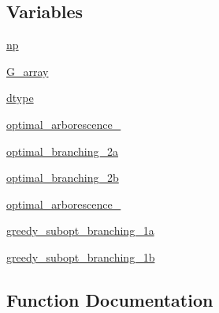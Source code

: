 \subsection*{Variables}
\begin{DoxyCompactItemize}
\item 
\hyperlink{namespacenetworkx_1_1algorithms_1_1tree_1_1tests_1_1test__branchings_ae2507982e07789df9fcd05d5cbb41c9a}{np}
\item 
\hyperlink{namespacenetworkx_1_1algorithms_1_1tree_1_1tests_1_1test__branchings_a1066de0f0cde2bc3fb40609c1d8a3f7e}{G\+\_\+array}
\item 
\hyperlink{namespacenetworkx_1_1algorithms_1_1tree_1_1tests_1_1test__branchings_ac92ce4cb48dc16593d99a1138f9f496b}{dtype}
\item 
\hyperlink{namespacenetworkx_1_1algorithms_1_1tree_1_1tests_1_1test__branchings_a4bffbaac2617620e58fd1049a7f058d2}{optimal\+\_\+arborescence\+\_}
\item 
\hyperlink{namespacenetworkx_1_1algorithms_1_1tree_1_1tests_1_1test__branchings_a8c3bf41acd4c2bae02510c1424eb2863}{optimal\+\_\+branching\+\_\+2a}
\item 
\hyperlink{namespacenetworkx_1_1algorithms_1_1tree_1_1tests_1_1test__branchings_a8135729f7457587c48709fc3bc9a8fa3}{optimal\+\_\+branching\+\_\+2b}
\item 
\hyperlink{namespacenetworkx_1_1algorithms_1_1tree_1_1tests_1_1test__branchings_ad4c7c306075062769b8edb2b84e9f926}{optimal\+\_\+arborescence\+\_}
\item 
\hyperlink{namespacenetworkx_1_1algorithms_1_1tree_1_1tests_1_1test__branchings_a4b7e7017ae58e94acd707ca1742f0c20}{greedy\+\_\+subopt\+\_\+branching\+\_\+1a}
\item 
\hyperlink{namespacenetworkx_1_1algorithms_1_1tree_1_1tests_1_1test__branchings_a03515da1a09dcd4b94a50c115fe1d9cb}{greedy\+\_\+subopt\+\_\+branching\+\_\+1b}
\end{DoxyCompactItemize}


\subsection{Function Documentation}
\mbox{\label{namespacenetworkx_1_1algorithms_1_1tree_1_1tests_1_1test__branchings_a5a118ea8fbc3d56205acebbbacbbb479}} 
